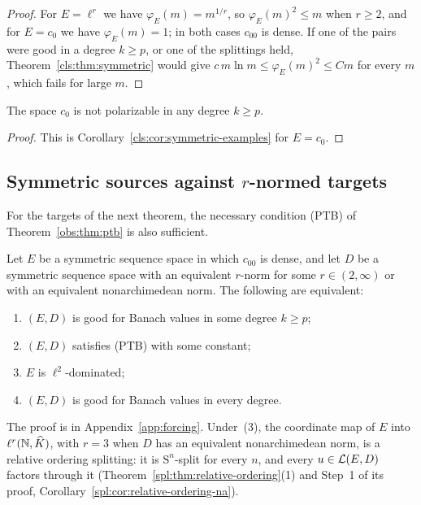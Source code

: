 \begin{proof}
For $E=\ell^r$ we have $\varphi_E(m)=m^{1/r}$, so $\varphi_E(m)^2\le m$ when $r\ge2$, and for $E=c_0$ we have
$\varphi_E(m)=1$; in both cases $c_{00}$ is dense. If one of the pairs were good in a degree $k\ge p$, or one of the
splittings held, Theorem~\ref{cls:thm:symmetric} would give $c\,m\ln m\le\varphi_E(m)^2\le Cm$ for every $m$, which
fails for large $m$.
\end{proof}

\begin{corollary}\label{cls:cor:c0-not-polarizable}
The space $c_0$ is not polarizable in any degree $k\ge p$.
\end{corollary}

\begin{proof}
This is Corollary~\ref{cls:cor:symmetric-examples} for $E=c_0$.
\end{proof}

\subsection{Symmetric sources against \texorpdfstring{$r$}{r}-normed targets}

For the targets of the next theorem, the necessary condition \textup{(PTB)} of Theorem~\ref{obs:thm:ptb} is also sufficient.

\begin{theorem}\label{cls:thm:rnorm}
Let $E$ be a symmetric sequence space in which $c_{00}$ is dense, and let $D$ be a symmetric sequence space with an
equivalent $r$\nobreakdash-norm for some $r\in(2,\infty)$ or with an equivalent nonarchimedean norm. The following are
equivalent:
\begin{enumerate}
\item $(E,D)$ is good for Banach values in some degree $k\ge p$;
\item $(E,D)$ satisfies \textup{(PTB)} with some constant;
\item $E$ is $\ell^2$\nobreakdash-dominated;
\item $(E,D)$ is good for Banach values in every degree.
\end{enumerate}
\end{theorem}

The proof is in Appendix~\ref{app:forcing}. Under~(3), the coordinate map of $E$ into $\ell^r(\mathbb N,\widehat K)$, with $r=3$ when
$D$ has an equivalent nonarchimedean norm, is a relative ordering splitting: it is $\mathrm S^n$\nobreakdash-split for
every $n$, and every $u\in\mathcal L(E,D)$ factors through it (Theorem~\ref{spl:thm:relative-ordering}(1) and Step~1 of its
proof, Corollary~\ref{spl:cor:relative-ordering-na}).

